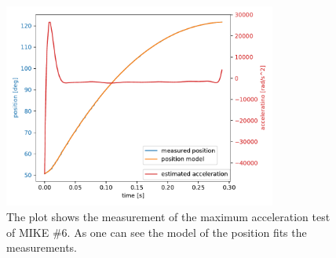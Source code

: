\begin{figure}[h]
 \centering
 \includegraphics[width=0.8\textwidth]{chapters/maximum Acceleration/max_Acceleration_example.pdf}
 \caption{The plot shows the measurement of the maximum acceleration test of MIKE \#6. As one can see the model of the position fits the measurements.}
 \label{fig:meine-grafik}
\end{figure}